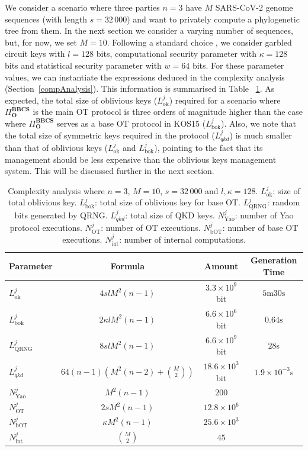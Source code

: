 We consider a scenario where three parties $n=3$ have $M$ SARS-CoV-2 genome sequences (with length $s=32\,000$) and want to privately compute a phylogenetic tree from them. In the next section we consider a varying number of sequences, but, for now, we set $M=10$. Following a standard choice \cite{ALSZ13}, we consider garbled circuit keys with $l = 128$ bits, computational security parameter with $\kappa = 128$ bits and statistical security parameter with $w = 64$ bits. For these parameter values, we can instantiate the expressions deduced in the complexity analysis (Section~\ref{compAnalysis}). This information is summarised in Table~ \ref{table:phylo_tree_complexity}. As expected, the total size of oblivious keys ($L^j_{\text{ok}}$) required for a scenario where $\Pi^{\textbf{BBCS}}_{\textbf{O}}$ is the main OT protocol is three orders of magnitude higher than the case where $\Pi^{\textbf{BBCS}}_{\textbf{O}}$ serves as a base OT protocol in KOS15 ($L^j_{\text{bok}}$). Also, we note that the total size of symmetric keys required in the protocol ($L^j_{qkd}$) is much smaller than that of oblivious keys ($L^j_{\text{ok}}$ and $L^j_{\text{bok}}$), pointing to the fact that its management should be less expensive than the oblivious keys management system. This will be discussed further in the next section.

\begin{table}[t]
\centering
\begin{tabular}{lccc}
\toprule
Parameter & Formula & Amount & Generation Time \\ 
\midrule
$L^j_{\text{ok}}$ & $4slM^2(n-1)$ & $3.3 \times 10^9$ bit & $5\text{m}30\text{s}$ \\ 
$L^j_{\text{bok}}$ & $2\kappa lM^2(n-1)$ & $6.6 \times 10^6$ bit & $0.64\text{s}$ \\ 
$L^j_{\text{QRNG}}$ & $8slM^2(n-1)$ & $6.6 \times 10^9$ bit & $28$s \\ 
$L^{j}_{qkd}$ & $64(n-1)(M^2(n-2) + \binom{M}{2})$ & $18.6 \times 10^3$ bit & $1.9\times 10^{-3}$s \\
$N^j_{\text{Yao}}$ & $M^2(n-1)$ & $200$ &  \\ 
$N^j_{\text{OT}}$ & $2sM^2(n-1)$ & $12.8 \times 10^6$ &  \\ 
$N^j_{\text{bOT}}$ & $\kappa M^2(n-1)$ & $25.6 \times 10^3$ &  \\
$N^j_{\text{int}}$ & $\binom{M}{2}$ & $45$ &  \\ 
\bottomrule
\end{tabular}
\caption{Complexity analysis where $n=3$, $M=10$, $s=32\,000$ and $l, \kappa=128$. $L^j_{\text{ok}}$: size of total oblivious key. $L^j_{\text{bok}}$:  total size of oblivious key for base OT. $L^j_{\text{QRNG}}$: random bits generated by QRNG. $L^{j}_{qkd}$: total size of QKD keys. $N^j_{\text{Yao}}$: number of Yao protocol executions. $N^j_{\text{OT}}$: number of OT executions. $N^j_{\text{bOT}}$: number of base OT executions. $N^j_{\text{int}}$: number of internal computations.}
\label{table:phylo_tree_complexity}
\end{table}

